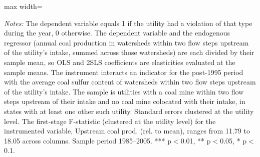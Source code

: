 \begin{table}[htbp]
{\begin{adjustbox}{max width=\linewidth}
\begin{tabular}
\bottomrule
\end{tabular}
\end{adjustbox}
}
\begin{minipage}{\linewidth}
\vspace{4pt}
\footnotesize
\raggedright
\textit{Notes:} The dependent variable equals 1 if the utility had a violation of that type during the year, 0 otherwise. The dependent variable and the endogenous regressor (annual coal production in watersheds within two flow steps upstream of the utility's intake, summed across those watersheds) are each divided by their sample mean, so OLS and 2SLS coefficients are elasticities evaluated at the sample means. The instrument interacts an indicator for the post-1995 period with the average coal sulfur content of watersheds within two flow steps upstream of the utility's intake. The sample is utilities with a coal mine within two flow steps upstream of their intake and no coal mine colocated with their intake, in states with at least one other such utility. Standard errors clustered at the utility level. The first-stage F-statistic (clustered at the utility level) for the instrumented variable, Upstream coal prod. (rel. to mean), ranges from 11.79 to 18.05 across columns. Sample period 1985--2005. *** p$<$0.01, ** p$<$0.05, * p$<$0.1.
\end{minipage}
\end{table}
